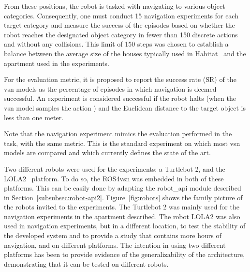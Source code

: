 From these positions, the robot is tasked with navigating to various object categories.
Consequently, one must conduct 15 navigation experiments for each target category and measure the success of the episodes based on whether the robot reaches the designated object category in fewer than 150 discrete actions and without any collisions.
This limit of 150 steps was chosen to establish a balance between the average size of the houses typically used in Habitat~\cite{NEURIPS2021_021bbc7e} and the apartment used in the experiments.

For the evaluation metric, it is proposed to report the success rate (SR) of the \acrshort{vsn} models as the percentage of episodes in which navigation is deemed successful.
An experiment is considered successful if the robot halts (when the \acrshort{vsn} model samples the action \stopac) and the Euclidean distance to the target object is less than one meter.

Note that the navigation experiment mimics the evaluation performed in the \objnav~\cite{batra2020} task, with the same metric.
This is the standard experiment on which most \acrshort{vsn} models are compared and which currently defines the state of the art.


Two different robots were used for the experiments: a Turtlebot 2, and the LOLA2~\cite{LOLA} platform.
To do so, the ROS4\acrshort{vsn} was embedded in both of these platforms.
This can be easily done by adapting the robot\_api module described in Section~\ref{subsubsec:robot-api2}.
Figure~\ref{fig:robots} shows the family picture of the robots invited to the experiments.
The Turtlebot 2 was mainly used for the navigation experiments in the apartment described.
The robot LOLA2 was also used in navigation experiments, but in a different location, to test the stability of the developed system and to provide a study that contains more hours of navigation, and on different platforms.
The intention in using two different platforms has been to provide evidence of the generalizability of the architecture, demonstrating that it can be tested on different robots.

